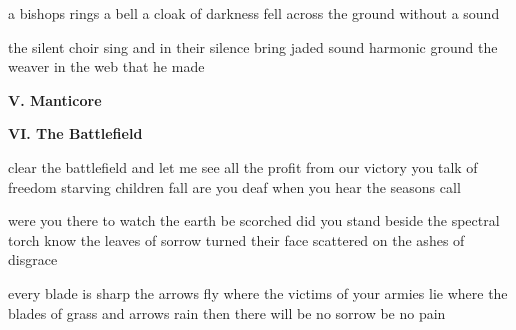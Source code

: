 \documentclass{article}
\renewcommand{\part}[1]{
  \begin{center}
    \textbf{#1}
  \end{center}
  \fontcream
}
\begin{document}
a bishops rings a bell
a cloak of darkness fell across the ground
without a sound

the silent choir sing and in their silence
bring jaded sound harmonic ground
the weaver in the web that he made

\part{V. Manticore}

\part{VI. The Battlefield}

clear the battlefield and let me see
all the profit from our victory
you talk of freedom starving children fall
are you deaf when you hear the seasons call

were you there to watch the earth be scorched
did you stand beside the spectral torch
know the leaves of sorrow turned their face
scattered on the ashes of disgrace

every blade is sharp the arrows fly
where the victims of your armies lie
where the blades of grass and arrows rain
then there will be no sorrow
be no pain
\end{document}
